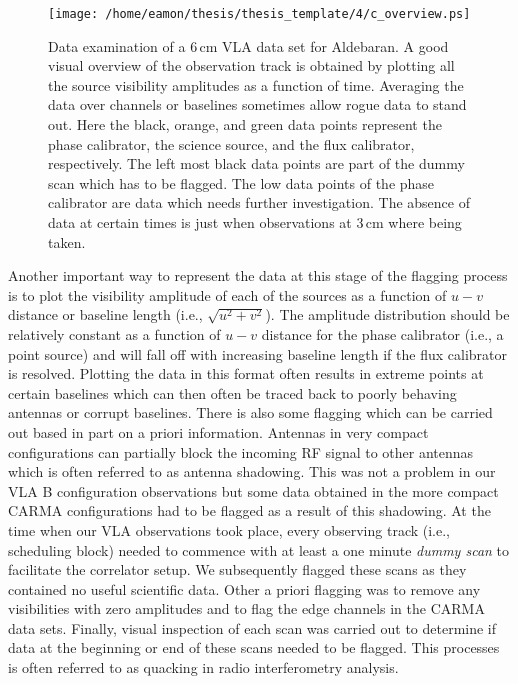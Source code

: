 \begin{figure}[hbt!]
\centering 
\texttt{[image: /home/eamon/thesis/thesis\_template/4/c\_overview.ps]}  
\caption[Data examination of a VLA data set.]{Data examination of a 6\,cm VLA data set for Aldebaran. A good visual overview of the observation track is obtained by plotting all the source visibility amplitudes as a function of time. Averaging the data over channels or baselines sometimes allow rogue data to stand out. Here the black, orange, and green data points represent the phase calibrator, the science source, and the flux calibrator, respectively. The left most black data points are part of the dummy scan which has to be flagged. The low data points of the phase calibrator are data which needs further investigation. The absence of data at certain times is just when observations at 3\,cm where being taken.}
\label{fig:4.2}
\end{figure}

Another important way to represent the data at this stage of the flagging process is to plot the visibility amplitude of each of the sources as a function of $u-v$ distance or baseline length (i.e., $\sqrt{u^2 + v^2}$). The amplitude distribution should be relatively constant as a function of $u-v$ distance for the phase calibrator (i.e., a point source) and will fall off with increasing baseline length if the flux calibrator is resolved. Plotting the data in this format often results in extreme points at certain baselines which can then often be traced back to poorly behaving antennas or corrupt baselines. There is also some flagging which can be carried out based in part on a priori information. Antennas in very compact configurations can partially block the incoming RF signal to other antennas which is often referred to as antenna shadowing. This was not a problem in our VLA B configuration observations but some data obtained in the more compact CARMA configurations had to be flagged as a result of this shadowing. At the time when our VLA observations took place, every observing track (i.e., scheduling block) needed to commence with at least a one minute \textit{dummy scan} to facilitate the correlator setup. We subsequently flagged these scans as they contained no useful scientific data. Other a priori flagging was to remove any visibilities with zero amplitudes and to flag the edge channels in the CARMA data sets. Finally, visual inspection of each scan was carried out to determine if data at the beginning or end of these scans needed to be flagged. This processes is often referred to as quacking in radio interferometry analysis.

